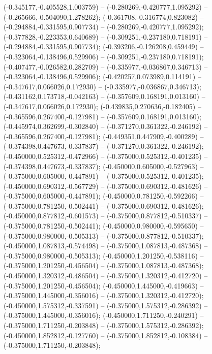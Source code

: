  (-0.345177,-0.405528,1.003759) -- (-0.280269,-0.420777,1.095292) -- (-0.265666,-0.504090,1.278262);
 (-0.361708,-0.316774,0.823082) -- (-0.294884,-0.331595,0.907734) -- (-0.280269,-0.420777,1.095292);
 (-0.377828,-0.223353,0.640689) -- (-0.309251,-0.237180,0.718191) -- (-0.294884,-0.331595,0.907734);
 (-0.393206,-0.126208,0.459449) -- (-0.323064,-0.138496,0.529906) -- (-0.309251,-0.237180,0.718191);
 (-0.407477,-0.026582,0.282709) -- (-0.335977,-0.036867,0.346713) -- (-0.323064,-0.138496,0.529906);
 (-0.420257,0.073989,0.114191) -- (-0.347617,0.066026,0.172930) -- (-0.335977,-0.036867,0.346713);
 (-0.431162,0.173718,-0.042163) -- (-0.357609,0.168191,0.013160) -- (-0.347617,0.066026,0.172930);
 (-0.439835,0.270636,-0.182405) -- (-0.365596,0.267400,-0.127981) -- (-0.357609,0.168191,0.013160);
 (-0.445974,0.362699,-0.302840) -- (-0.371270,0.361322,-0.246192) -- (-0.365596,0.267400,-0.127981);
 (-0.449351,0.447909,-0.400289) -- (-0.374398,0.447673,-0.337837) -- (-0.371270,0.361322,-0.246192);
 (-0.450000,0.525312,-0.472966) -- (-0.375000,0.525312,-0.401235) -- (-0.374398,0.447673,-0.337837);
 (-0.450000,0.605000,-0.527963) -- (-0.375000,0.605000,-0.447891) -- (-0.375000,0.525312,-0.401235);
 (-0.450000,0.690312,-0.567729) -- (-0.375000,0.690312,-0.481626) -- (-0.375000,0.605000,-0.447891);
 (-0.450000,0.781250,-0.592266) -- (-0.375000,0.781250,-0.502441) -- (-0.375000,0.690312,-0.481626);
 (-0.450000,0.877812,-0.601573) -- (-0.375000,0.877812,-0.510337) -- (-0.375000,0.781250,-0.502441);
 (-0.450000,0.980000,-0.595650) -- (-0.375000,0.980000,-0.505313) -- (-0.375000,0.877812,-0.510337);
 (-0.450000,1.087813,-0.574498) -- (-0.375000,1.087813,-0.487368) -- (-0.375000,0.980000,-0.505313);
 (-0.450000,1.201250,-0.538116) -- (-0.375000,1.201250,-0.456504) -- (-0.375000,1.087813,-0.487368);
 (-0.450000,1.320312,-0.486504) -- (-0.375000,1.320312,-0.412720) -- (-0.375000,1.201250,-0.456504);
 (-0.450000,1.445000,-0.419663) -- (-0.375000,1.445000,-0.356016) -- (-0.375000,1.320312,-0.412720);
 (-0.450000,1.575312,-0.337591) -- (-0.375000,1.575312,-0.286392) -- (-0.375000,1.445000,-0.356016);
 (-0.450000,1.711250,-0.240291) -- (-0.375000,1.711250,-0.203848) -- (-0.375000,1.575312,-0.286392);
 (-0.450000,1.852812,-0.127760) -- (-0.375000,1.852812,-0.108384) -- (-0.375000,1.711250,-0.203848);
